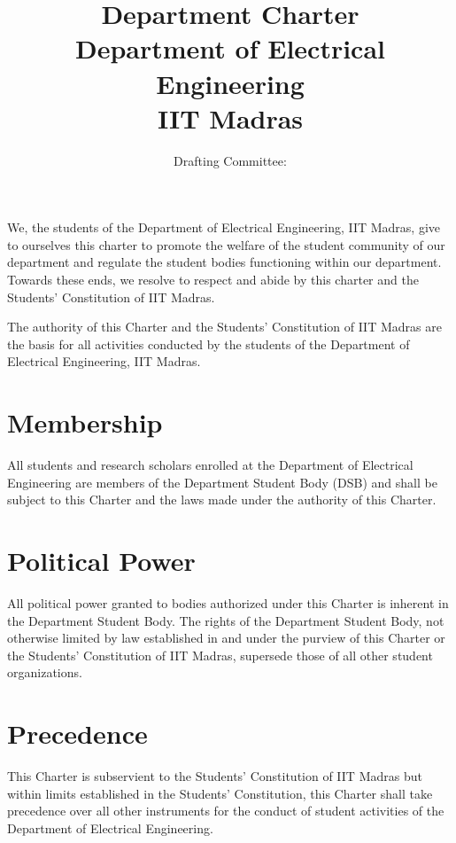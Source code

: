 \documentclass[12pt]{charter}
\makeatletter
\newcommand{\authortable}[1]{
  \gdef\@authortable{%
  \bgroup
	\def\arraystretch{1.5} %
  \begin{tabular}{|c|c|}
  \hline
  \textsc{Rakesh Raavi} & Department Legislator (Academic) 2018-19\\
  \hline
  \textsc{Sudharshan R} & Research Affairs Secretary 2018-19\\
  \hline
  \textsc{Samyak Raj Pasala} & EEA Secretary 2018-19\\
  \hline
  \textsc{B Akhil} & EEA Core 2017-18\\
  \hline
  \end{tabular}
  \egroup
  }
}
\makeatother
\begin{document}
\title{Department Charter\\Department of Electrical Engineering\\IIT Madras}
\author{Drafting Committee:}
\authortable{} %
\date{}
\maketitle
\setcounter{tocdepth}{1}
\tableofcontents
\newpage

We, the students of the Department of Electrical Engineering, IIT Madras, give to ourselves this charter to promote the welfare of the student community of our department and regulate the student bodies functioning within our department. Towards these ends, we resolve to respect and abide by this charter and the Students' Constitution of IIT Madras.



The authority of this Charter and the Students’ Constitution of IIT Madras are the basis for all activities conducted by the students of the Department of Electrical Engineering, IIT Madras.

\section{Membership}
All students and research scholars enrolled at the Department of Electrical Engineering are members of the Department Student Body (DSB) and shall be subject to this Charter and the laws made under the authority of this Charter.


\section{Political Power}
All political power granted to bodies authorized under this Charter is inherent in the Department Student Body. The rights of the Department Student Body, not otherwise limited by law established in and under the purview of this Charter or the Students’ Constitution of IIT Madras, supersede those of all other student organizations.

\section{Precedence}
This Charter is subservient to the Students’ Constitution of IIT Madras but within limits established in the Students’ Constitution, this Charter shall take precedence over all other instruments for the conduct of student activities of the Department of Electrical Engineering.
\end{document}
